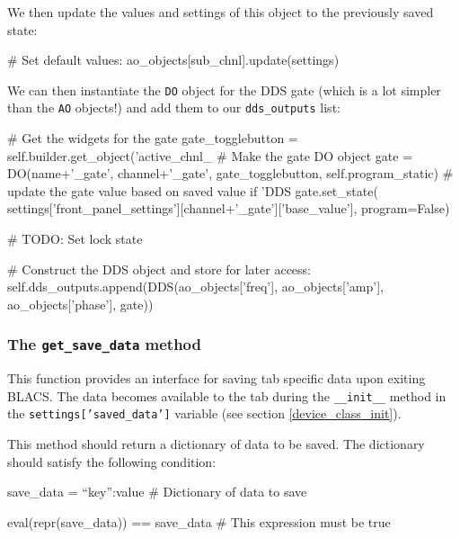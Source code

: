 \documentclass[12pt]{article}
\begin{document}
We then update the values and settings of this object to the previously saved state:
\begin{python}
                # Set default values:
                ao_objects[sub_chnl].update(settings)
\end{python}

We can then instantiate the \texttt{DO} object for the DDS gate (which is a lot simpler than the \texttt{AO} objects!) and add them to our \texttt{dds\_outputs} list:
\begin{python}
            # Get the widgets for the gate
            gate_togglebutton = self.builder.get_object('active_chnl_%
            # Make the gate DO object            
            gate = DO(name+'_gate', 
                      channel+'_gate', 
                      gate_togglebutton, 
                      self.program_static)
            # update the gate value based on saved value
            if 'DDS %
                gate.set_state(
                   settings['front_panel_settings'][channel+'_gate']['base_value'],
                   program=False)
                    
                # TODO: Set lock state
                    
            # Construct the DDS object and store for later access:
            self.dds_outputs.append(DDS(ao_objects['freq'],
                                        ao_objects['amp'],
                                        ao_objects['phase'],
                                        gate))
\end{python}


\subsubsection{The \texttt{get\_save\_data} method} \label{device_class_get_save_data}
This function provides an interface for saving tab specific data upon exiting BLACS. The data becomes available to the tab during the \texttt{\_\_init\_\_} method in the \texttt{settings['saved\_data']} variable (see section \ref{device_class_init}).

This method should return a dictionary of data to be saved. The dictionary should satisfy the following condition:
\begin{python}
save_data = {``key'':value} # Dictionary of data to save

eval(repr(save_data)) == save_data # This expression must be true
\end{python}
\end{document}
